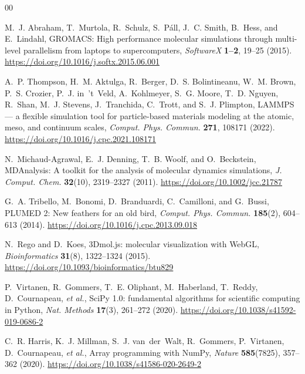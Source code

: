 \documentclass[11pt,a4paper]{article}
\begin{document}
{\small
\begin{thebibliography}{00}
\setlength{\itemsep}{2pt}

M.~J. Abraham, T.~Murtola, R.~Schulz, S.~P\'{a}ll, J.~C. Smith, B.~Hess, and
E.~Lindahl,
\newblock GROMACS: High performance molecular simulations through multi-level
  parallelism from laptops to supercomputers,
\newblock \emph{SoftwareX} \textbf{1--2}, 19--25 (2015).
\newblock \url{https://doi.org/10.1016/j.softx.2015.06.001}

A.~P. Thompson, H.~M. Aktulga, R.~Berger, D.~S. Bolintineanu, W.~M. Brown,
P.~S. Crozier, P.~J. in~'t~Veld, A.~Kohlmeyer, S.~G. Moore, T.~D. Nguyen,
R.~Shan, M.~J. Stevens, J.~Tranchida, C.~Trott, and S.~J. Plimpton,
\newblock LAMMPS --- a flexible simulation tool for particle-based materials
  modeling at the atomic, meso, and continuum scales,
\newblock \emph{Comput. Phys. Commun.} \textbf{271}, 108171 (2022).
\newblock \url{https://doi.org/10.1016/j.cpc.2021.108171}

N.~Michaud-Agrawal, E.~J. Denning, T.~B. Woolf, and O.~Beckstein,
\newblock MDAnalysis: A toolkit for the analysis of molecular dynamics
  simulations,
\newblock \emph{J. Comput. Chem.} \textbf{32}(10), 2319--2327 (2011).
\newblock \url{https://doi.org/10.1002/jcc.21787}

G.~A. Tribello, M.~Bonomi, D.~Branduardi, C.~Camilloni, and G.~Bussi,
\newblock PLUMED 2: New feathers for an old bird,
\newblock \emph{Comput. Phys. Commun.} \textbf{185}(2), 604--613 (2014).
\newblock \url{https://doi.org/10.1016/j.cpc.2013.09.018}

N.~Rego and D.~Koes,
\newblock 3Dmol.js: molecular visualization with WebGL,
\newblock \emph{Bioinformatics} \textbf{31}(8), 1322--1324 (2015).
\newblock \url{https://doi.org/10.1093/bioinformatics/btu829}

P.~Virtanen, R.~Gommers, T.~E. Oliphant, M.~Haberland, T.~Reddy,
D.~Cournapeau, \emph{et al.},
\newblock SciPy 1.0: fundamental algorithms for scientific computing in Python,
\newblock \emph{Nat. Methods} \textbf{17}(3), 261--272 (2020).
\newblock \url{https://doi.org/10.1038/s41592-019-0686-2}

C.~R. Harris, K.~J. Millman, S.~J. van~der~Walt, R.~Gommers, P.~Virtanen,
D.~Cournapeau, \emph{et al.},
\newblock Array programming with NumPy,
\newblock \emph{Nature} \textbf{585}(7825), 357--362 (2020).
\newblock \url{https://doi.org/10.1038/s41586-020-2649-2}


\end{thebibliography}}
\end{document}
